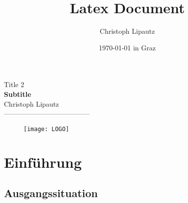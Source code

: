 \documentclass[12pt]{scrartcl}
\title{Latex Document}
\author{Christoph Lipautz}
\date{\today{} in Graz}
\begin{document}

\begin{titlepage}
  \begin{center}
    \vspace*{0.5cm}
    {\LARGE Title 2} \\
    \vspace{15mm} {\huge \textbf{Subtitle}\\}
    \vspace{15mm}
    {\LARGE Christoph Lipautz} \\
    \vspace{10mm}%
    -------------------------------------- \\
    \vspace{10mm}%
    \large
    \vspace{15mm}%
    \begin{figure}[!ht]
    \begin{center}
    \centerline{\texttt{[image: LOGO]}}
    \end{center}
    \end{figure}
  \end{center}
\end{titlepage}

\pagebreak


\clearpage
\tableofcontents
\pagebreak

\section{Einführung}
\label{sec:introduction}

  \subsection{Ausgangssituation}
  \label{sec:preface}

\pagebreak


\listoffigures





\end{document}
